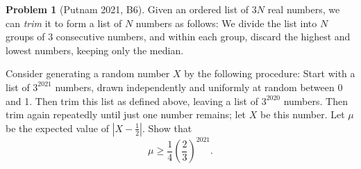 \documentclass{scrartcl}
\theoremstyle{definition}
\newtheorem*{prob}{Problem}
\begin{document}
\begin{prob}[Putnam 2021, B6]
Given an ordered list of $3N$ real numbers, we can \emph{trim} it to form a list of $N$ numbers as follows: We divide the list into $N$ groups of $3$ consecutive numbers, and within each group, discard the highest and lowest numbers, keeping only the median.

Consider generating a random number $X$ by the following procedure: Start with a list of $3^{2021}$ numbers, drawn independently and uniformly at random between 0 and 1. Then trim this list as defined above, leaving a list of $3^{2020}$ numbers. Then trim again repeatedly until just one number remains; let $X$ be this number. Let $\mu$ be the expected value of $|X - \frac{1}{2}|$. Show that
\[
\mu \geq \frac{1}{4} \left( \frac{2}{3} \right)^{2021}.
\]
\end{prob}
\end{document}
